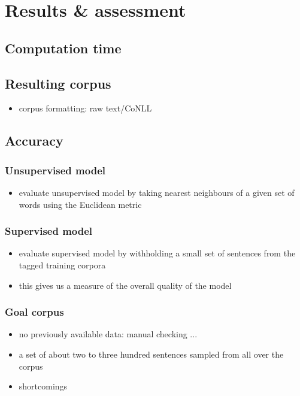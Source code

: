 
\chapter{Results \& assessment}
\label{chp:interpretation}

\section{Computation time}
\label{sec:computationtime}

\section{Resulting corpus}
\label{sec:result}
\begin{itemize}
\item corpus formatting: raw text/CoNLL
\end{itemize}

\section{Accuracy}
\label{sec:accuracy}

\subsection{Unsupervised model}
\label{sec:unsupacc}
\begin{itemize}
\item evaluate unsupervised model by taking nearest neighbours of a
  given set of words using the Euclidean metric
\end{itemize}

\subsection{Supervised model}
\label{sec:supacc}
\begin{itemize}
\item evaluate supervised model by withholding a small set of sentences from the tagged training corpora
\item this gives us a measure of the overall quality of the model
\end{itemize}

\subsection{Goal corpus}
\label{sec:supacc}
\begin{itemize}
\item no previously available data: manual checking ...
\item a set of about two to three hundred sentences sampled from all over the corpus
\item shortcomings
\end{itemize}